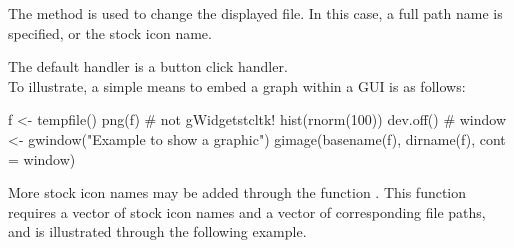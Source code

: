 The  method is used to change the
displayed file. In this case, a full path name is specified, or the
stock icon name.

The default handler is a button click handler.
\\

To illustrate, a simple means to embed a graph within a GUI is as follows:
\begin{Schunk}
\begin{Sinput}
 f <- tempfile()
 png(f)                                  # not gWidgetstcltk!
 hist(rnorm(100))
 dev.off()
 #
 window <- gwindow("Example to show a graphic")
 gimage(basename(f), dirname(f), cont = window)
\end{Sinput}
\end{Schunk}
%

More stock icon names may be added through the function
. This function requires a vector of stock icon
names and a vector of corresponding file paths, and is illustrated
through the following example.


